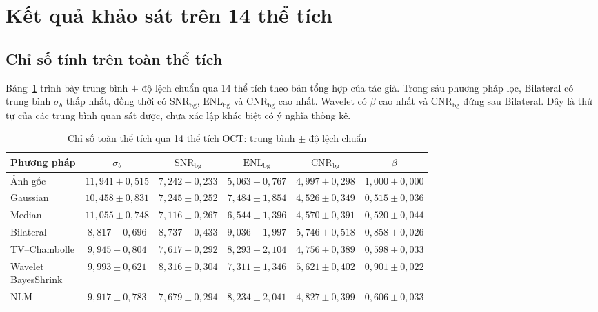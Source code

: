 \documentclass[14pt,a4paper,oneside]{extreport}
\begin{document}
\section{Kết quả khảo sát trên 14 thể tích}
\label{sec:denoise-14-results}
\subsection{Chỉ số tính trên toàn thể tích}
Bảng~\ref{tab:denoise-14-whole} trình bày trung bình $\pm$ độ lệch
chuẩn qua 14 thể tích theo bản tổng hợp của tác giả. Trong
sáu phương pháp lọc, Bilateral có trung bình $\sigma_b$ thấp nhất,
đồng thời có $\mathrm{SNR}_{\mathrm{bg}}$, $\mathrm{ENL}_{\mathrm{bg}}$
và $\mathrm{CNR}_{\mathrm{bg}}$ cao nhất. Wavelet có $\beta$ cao
nhất và $\mathrm{CNR}_{\mathrm{bg}}$ đứng sau Bilateral. Đây là
thứ tự của các trung bình quan sát được, chưa xác lập khác biệt
có ý nghĩa thống kê.

\begin{table}[htbp]
 \centering
 \caption{Chỉ số toàn thể tích qua 14 thể tích OCT: trung bình $\pm$ độ lệch chuẩn}
 \label{tab:denoise-14-whole}
 \begingroup
 \fontsize{11.5pt}{13.8pt}\selectfont
 \setlength{\tabcolsep}{3pt}
 \begin{tabular}{@{}lccccc@{}}
 \toprule
 Phương pháp & $\sigma_b$ & $\mathrm{SNR}_{\mathrm{bg}}$ & $\mathrm{ENL}_{\mathrm{bg}}$ & $\mathrm{CNR}_{\mathrm{bg}}$ & $\beta$\\
 \midrule
 Ảnh gốc & $11{,}941\pm0{,}515$ & $7{,}242\pm0{,}233$ & $5{,}063\pm0{,}767$ & $4{,}997\pm0{,}298$ & $1{,}000\pm0{,}000$\\
 Gaussian & $10{,}458\pm0{,}831$ & $7{,}245\pm0{,}252$ & $7{,}484\pm1{,}854$ & $4{,}526\pm0{,}349$ & $0{,}515\pm0{,}036$\\
 Median & $11{,}055\pm0{,}748$ & $7{,}116\pm0{,}267$ & $6{,}544\pm1{,}396$ & $4{,}570\pm0{,}391$ & $0{,}520\pm0{,}044$\\
 Bilateral & $8{,}817\pm0{,}696$ & $8{,}737\pm0{,}433$ & $9{,}036\pm1{,}997$ & $5{,}746\pm0{,}518$ & $0{,}858\pm0{,}026$\\
 TV--Chambolle & $9{,}945\pm0{,}804$ & $7{,}617\pm0{,}292$ & $8{,}293\pm2{,}104$ & $4{,}756\pm0{,}389$ & $0{,}598\pm0{,}033$\\
 \shortstack[l]{Wavelet\\BayesShrink} & $9{,}993\pm0{,}621$ & $8{,}316\pm0{,}304$ & $7{,}311\pm1{,}346$ & $5{,}621\pm0{,}402$ & $0{,}901\pm0{,}022$\\
 NLM & $9{,}917\pm0{,}783$ & $7{,}679\pm0{,}294$ & $8{,}234\pm2{,}041$ & $4{,}827\pm0{,}399$ & $0{,}606\pm0{,}033$\\
 \bottomrule
 \end{tabular}
 \endgroup
 \par{}
\end{table}
\FloatBarrier
\end{document}
